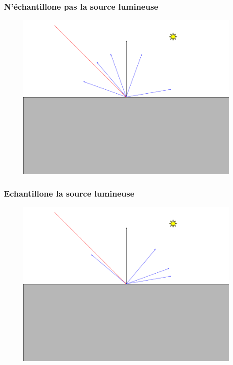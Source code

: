 \documentclass[handout]{beamer}
\begin{document}
\begin{frame}
    \frametitle{N'échantillone pas la source lumineuse}
    \begin{figure}
        \includegraphics[scale=0.3]{Priority1.png}
    \end{figure}
\end{frame}

\begin{frame}
    \frametitle{Echantillone la source lumineuse}
    \begin{figure}
        \includegraphics[scale=0.3]{Priority2.png}
    \end{figure}
\end{frame}
\end{document}
